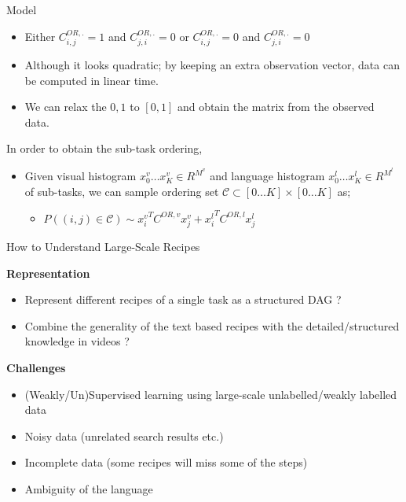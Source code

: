 \begin{frame}{Model}
\begin{itemize}
\item Either $C^{OR,.}_{i,j}=1$ and $C^{OR,.}_{j,i}=0$ or $C^{OR,.}_{i,j}=0$ and $C^{OR,.}_{j,i}=0$
\item Although it looks quadratic; by keeping an extra observation vector, data can be computed in linear time.
\item We can relax the ${0,1}$ to $[0,1]$ and obtain the matrix from the observed data.
\end{itemize}
In order to obtain the sub-task ordering,
\begin{itemize}
\item Given visual histogram $x^v_0 \ldots x^v_K \in R^{M^v}$ and language histogram $x^l_0 \ldots x^l_K \in R^{M^l}$ of sub-tasks, we can sample ordering set $\mathcal{C} \subset [0\ldots K]
 \times [0 \ldots K]$ as;
\begin{itemize}
\item $P((i,j) \in \mathcal{C}) \sim {x^v_i}^T C^{OR,v} x^v_j + {x^l_i}^T C^{OR,l} x^l_j$
\end{itemize} 
\end{itemize}
\end{frame}


\iffalse 

\begin{frame}{How to Understand Large-Scale Recipes}

{\bf Representation}
\begin{itemize}
\item Represent different recipes of a single task as a structured DAG ?
\item Combine the generality of the text based recipes with the detailed/structured knowledge in videos ?
\end{itemize}

{\bf Challenges}
\begin{itemize}
\item (Weakly/Un)Supervised learning using large-scale unlabelled/weakly labelled data 
\item Noisy data (unrelated search results etc.)
\item Incomplete data (some recipes will miss some of the steps)
\item Ambiguity of the language
\end{itemize}
\end{frame}

